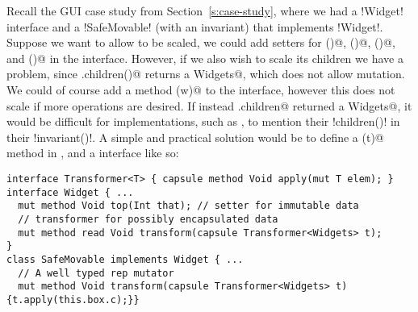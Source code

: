 Recall the GUI case study from Section~\ref{s:case-study}, where we had a \Q!Widget! interface and a \Q!SafeMovable! (with an invariant) that implements \Q!Widget!.
Suppose we want to allow \Q@Widget@s to be scaled, we could add \Q@mut@ setters for \Q@width()@, \Q@height()@, \Q@left()@, and \Q@top()@ in the \Q@Widget@ interface. However, if we also wish to scale its children we have a problem, since \Q@Widget.children()@ returns a \Q@read Widgets@, which does not allow mutation. We could of course add a \Q@mut@ method \Q@zoom(w)@ to the \Q@Widget@ interface, however this does not scale if more operations are desired. If instead \Q@Widget.children@ returned a \Q@mut Widgets@, it would be difficult for \Q@Widget@ implementations, such as \Q@SafeMovable@, 
to mention their \Q!children()! in their \Q!invariant()!.
A simple and practical solution would be to define a \Q@transform(t)@ method in \Q@Widget@, and a \Q@Transformer@ interface 
like so:
\begin{lstlisting}[escapechar=\%]
interface Transformer<T> { capsule method Void apply(mut T elem); }
interface Widget { ...
  mut method Void top(Int that); // setter for immutable data
  // transformer for possibly encapsulated data
  mut method read Void transform(capsule Transformer<Widgets> t);
}
class SafeMovable implements Widget { ...
  // A well typed rep mutator
  mut method Void transform(capsule Transformer<Widgets> t) {t.apply(this.box.c);}}
\end{lstlisting}
